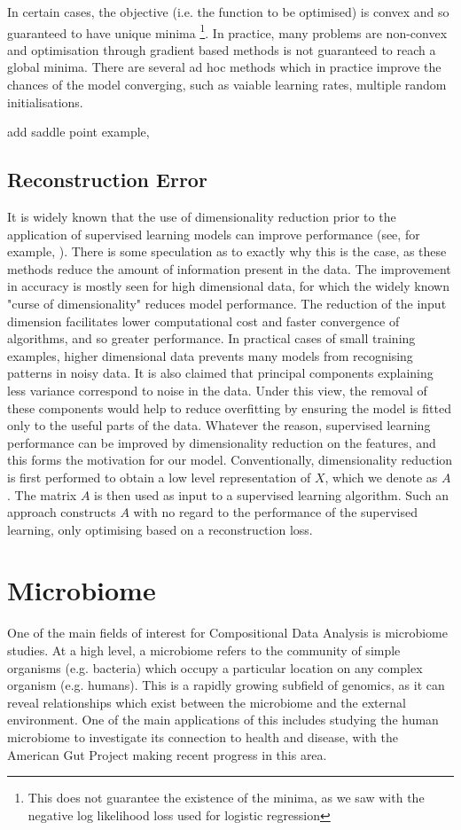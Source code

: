In certain cases, the objective (i.e. the function to be optimised) is convex and so guaranteed to have unique minima \footnote{This does not guarantee the existence of the minima, as we saw with the negative log likelihood loss used for logistic regression}.  In practice, many problems are non-convex and optimisation through gradient based methods is not guaranteed to reach a global minima. There are several ad hoc methods which in practice improve the chances of the model converging, such as vaiable learning rates, multiple random initialisations.    

add saddle point example, 

\subsection{Reconstruction Error}
\label{reconerror}
 It is widely known that the use of dimensionality reduction prior to the application of supervised learning models can improve performance (see, for example, \cite{HOWLEY2006363}). There is some speculation as to exactly why this is the case, as these methods reduce the amount of information present in the data. The improvement in accuracy is mostly seen for high dimensional data, for which the widely known "curse of dimensionality" reduces model performance. The reduction of the input dimension facilitates lower computational cost and faster convergence of algorithms, and so greater performance. In practical cases of small training examples, higher dimensional data prevents many models from recognising patterns in noisy data. It is also claimed that principal components explaining less variance correspond to noise in the data. Under this view, the removal of these components would help to reduce overfitting by ensuring the model is fitted only to the useful parts of the data. Whatever the reason, supervised learning performance can be improved by dimensionality reduction on the features, and this forms the motivation for our model. Conventionally, dimensionality reduction is first performed to obtain a low level representation of $X$, which we denote as $A$. The matrix $A$ is then used as input to a supervised learning algorithm. Such an approach constructs $A$ with no regard to the performance of the supervised learning, only optimising based on a reconstruction loss. 


\section{Microbiome}
\label{microbiome}
One of the main fields of interest for Compositional Data Analysis is microbiome studies. At a high level, a  microbiome refers to the community of simple organisms (e.g. bacteria) which occupy a particular location on any complex organism (e.g. humans). This is a rapidly growing subfield of genomics, as it can reveal relationships which exist between the microbiome and the external environment. One of the main applications of this includes studying the human microbiome to investigate its connection to health and disease, with the American Gut Project \citep{McDonalde00031-18} making recent progress in this area.

